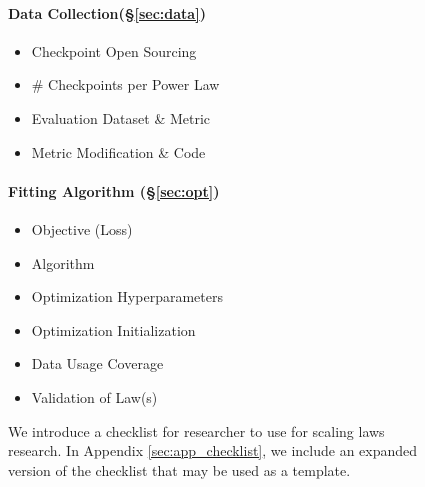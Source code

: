 \begin{figure}
{\begin{minipage}{38em}
\begin{minipage}[t]{0.28\textwidth}
\end{minipage}
\begin{minipage}[t]{0.23\textwidth}
\raggedright


\paragraph{Data Collection(\S\ref{sec:data})}
\begin{itemize}[leftmargin=*]
    \item Checkpoint Open Sourcing
    \item \# Checkpoints per Power Law
    \item Evaluation Dataset \& Metric
    \item Metric Modification \& Code 
\end{itemize}

\end{minipage}
\begin{minipage}[t]{0.28\textwidth}
\raggedright

\paragraph{Fitting Algorithm (\S\ref{sec:opt})}
\begin{itemize}[leftmargin=*]
    \item Objective (Loss)
    \item Algorithm
    \item Optimization Hyperparameters
    \item Optimization Initialization
    \item Data Usage Coverage
    \item Validation of Law(s)
\end{itemize}

\end{minipage}


\end{minipage}
}
\caption{We introduce a checklist for researcher to use for scaling laws research. In Appendix \ref{sec:app_checklist}, we include an expanded version of the checklist that may be used as a template. }
\end{figure}\label{sec:checklist}
